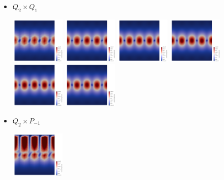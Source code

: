 \begin{itemize}
\item $Q_2\times Q_1$
\begin{center}
\includegraphics[width=2.6cm]{python_codes/fieldstone_120/paperresults/rt/structured/vel_q2q1.0000.png}
\includegraphics[width=2.6cm]{python_codes/fieldstone_120/paperresults/rt/structured/vel_q2q1.0001.png}
\includegraphics[width=2.6cm]{python_codes/fieldstone_120/paperresults/rt/structured/vel_q2q1.0002.png}
\includegraphics[width=2.6cm]{python_codes/fieldstone_120/paperresults/rt/structured/vel_q2q1.0003.png}
\includegraphics[width=2.6cm]{python_codes/fieldstone_120/paperresults/rt/structured/vel_q2q1.0004.png}
\includegraphics[width=2.6cm]{python_codes/fieldstone_120/paperresults/rt/structured/vel_q2q1.0005.png}
\end{center}
\item $Q_2\times P_{-1}$
\begin{center}
\includegraphics[width=2.6cm]{python_codes/fieldstone_120/paperresults/rt/structured/vel_q2pm1.0000.png}

\end{center}
\end{itemize}

